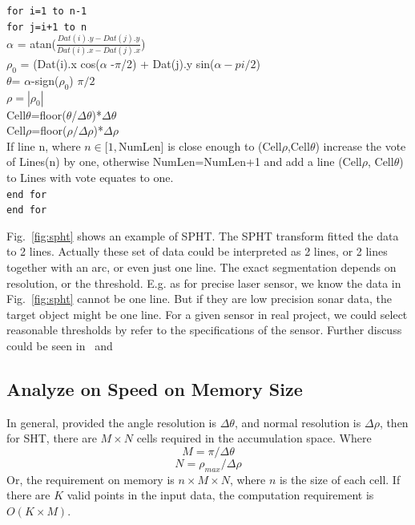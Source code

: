 \documentclass{cdcarta4}
\begin{document}
{\footnotesize
\texttt{for i=1 to n-1}\\
\hspace*{4mm}    \texttt{for j=i+1 to n} \\
\hspace*{8mm}                $\alpha$ = atan($\frac{ Dat(i).y- Dat(j).y}{Dat(i).x - Dat(j).x} $)\\
\hspace*{8mm}                $\rho_0$ = (Dat(i).x cos($\alpha$ -$\pi$/2) + Dat(j).y sin($\alpha-pi/2$)\\
\hspace*{8mm}                $\theta$= $\alpha$-sign($\rho_0$) $\pi/2$ \\
\hspace*{8mm}                $\rho=|\rho_0|$ \\
\hspace*{8mm}                Cell$\theta$=floor($\theta$/$\Delta\theta$)*$\Delta\theta$ \\
\hspace*{8mm}                Cell$\rho$=floor($\rho/\Delta\rho$)*$\Delta\rho$ \\
\hspace*{8mm}                If line n, where $n\in[1,$NumLen]  is close enough to (Cell$\rho$,Cell$\theta$) increase the vote of Lines(n) by one, otherwise NumLen=NumLen+1 and add a line (Cell$\rho$, Cell$\theta$) to Lines with vote equates to one.  \\
\hspace*{4mm}    \texttt{end for} \\
\texttt{end for}
}
    
Fig.~\ref{fig:spht} shows an example of SPHT. The SPHT transform fitted the data to 2 lines. 
Actually these set of data could be interpreted as 2 lines, or 2 lines together with an arc, or even just one line. The exact segmentation depends on resolution, or the threshold. E.g. as for precise laser sensor, we know the data in Fig.~\ref{fig:spht} cannot be one line. But if they are low precision sonar data, the target object might be one line. For a given sensor in real project, we could select reasonable thresholds by refer to the specifications of the sensor. Further discuss could be seen in~\cite{Goto98Efficient} and ~\cite{Goto00Design}

    \subsection{Analyze on Speed on Memory Size}
In general, provided the angle resolution is $\Delta\theta$, and normal resolution is $\Delta\rho$, then for SHT, there are $M\times N$ cells required in the accumulation space. Where $$ M = \pi/\Delta\theta $$ 
$$ N=\rho_{max}/\Delta\rho  $$
Or, the requirement on memory is $n\times M\times N$, where $n$ is the size of each cell.
If there are $K$ valid points in the input data, the computation requirement is $O(K\times M)$.
\end{document}
